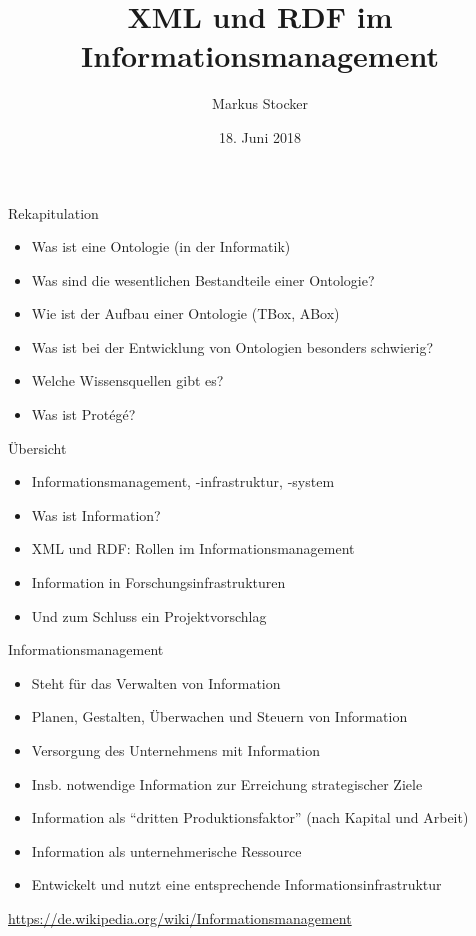 \documentclass{beamer}
\title{XML und RDF im Informationsmanagement}
\author{Markus Stocker}
\date{18. Juni 2018}
\begin{document}
\maketitle

\begin{frame}{Rekapitulation}
	
	\begin{itemize}
		\item Was ist eine Ontologie (in der Informatik)
		\item Was sind die wesentlichen Bestandteile einer Ontologie?
		\item Wie ist der Aufbau einer Ontologie (TBox, ABox)
		\item Was ist bei der Entwicklung von Ontologien besonders schwierig?
		\item Welche Wissensquellen gibt es?
		\item Was ist Prot{\'e}g{\'e}?
	\end{itemize}
	
\end{frame}

\begin{frame}{Übersicht}
	
	\begin{itemize}
		\item Informationsmanagement, -infrastruktur, -system
		\item Was ist Information?
		\item XML und RDF: Rollen im Informationsmanagement
		\item Information in Forschungsinfrastrukturen
		\item Und zum Schluss ein Projektvorschlag
	\end{itemize}
	
\end{frame}

\begin{frame}{Informationsmanagement}
	
	\begin{itemize}
		\item Steht für das Verwalten von Information
		\item Planen, Gestalten, Überwachen und Steuern von Information
		\item Versorgung des Unternehmens mit Information
		\item Insb. notwendige Information zur Erreichung strategischer Ziele
		\item Information als ``dritten Produktionsfaktor'' (nach Kapital und Arbeit)
		\item Information als unternehmerische Ressource
		\item Entwickelt und nutzt eine entsprechende Informationsinfrastruktur
	\end{itemize}
	
	\begin{flushright}
		\scriptsize\url{https://de.wikipedia.org/wiki/Informationsmanagement}
	\end{flushright}
	
\end{frame}
\end{document}
